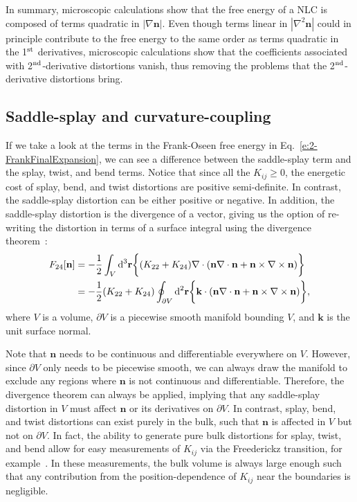 In summary, microscopic calculations show that the free energy of a NLC is composed of terms quadratic in $|\nabla \mathbf{n}|$.
Even though terms linear in $|\nabla ^2 \mathbf{n}|$ could in principle contribute to the free energy to the same order as terms quadratic in the 1$^\textup{\rm st}$ derivatives, microscopic calculations show that the coefficients associated with 2$^\textup{\rm nd}$-derivative distortions vanish, thus removing the problems that the 2$^\textup{\rm nd}$-derivative distortions bring.


\subsection{Saddle-splay and curvature-coupling}
If we take a look at the terms in the Frank-Oseen free energy in Eq.~\ref{e:2-FrankFinalExpansion}, we can see a difference between the saddle-splay term and the splay, twist, and bend terms.
Notice that since all the $K_{ij} \geq 0$, the energetic cost of splay, bend, and twist distortions are positive semi-definite.
In contrast, the saddle-splay distortion can be either positive or negative.
In addition, the saddle-splay distortion is the divergence of a vector, giving us the option of re-writing the distortion in terms of a surface integral using the divergence theorem~\cite{RN230}:
\begin{align}
  F_{24}[\mathbf{n}] &= - \frac{1}{2}\int_{V} \textup{d}^3  \mathbf{r} \bigg \{ (K_{22} + K_{24})  \nabla \cdot (\mathbf{n}\nabla \cdot \mathbf{n} + \mathbf{n} \times \nabla \times \mathbf{n}) \bigg \}\label{e:2-F24GaussA}  \\ &=
  - \frac{1}{2}(K_{22} + K_{24}) \oint_{\partial V} \textup{d}^2  \mathbf{r} \bigg \{   \mathbf{k} \cdot (\mathbf{n}\nabla \cdot \mathbf{n} + \mathbf{n} \times \nabla \times \mathbf{n}) \bigg \},\label{e:2-F24GaussB}
\end{align}
where $V$ is a volume, $\partial V$ is a piecewise smooth manifold bounding $V$, and $\mathbf{k}$ is the unit surface normal.

Note that $\mathbf{n}$ needs to be continuous and differentiable everywhere on $V$.
However, since $\partial V$ only needs to be piecewise smooth, we can always draw the manifold to exclude any regions where $\mathbf{n}$ is not continuous and differentiable.
Therefore, the divergence theorem can always be applied, implying that any saddle-splay distortion in $V$ must affect $\mathbf{n}$ or its derivatives on $\partial V$.
In contrast, splay, bend, and twist distortions can exist purely in the bulk, such that $\mathbf{n}$ is affected in $V$ but not on $\partial V$.
In fact, the ability to generate pure bulk distortions for splay, twist, and bend allow for easy measurements of $K_{ij}$ via the Freederickz transition, for example~\cite{RN212,RN213,RN33,RN188,RN182,RN183}.
In these measurements, the bulk volume is always large enough such that any contribution from the position-dependence of $K_{ij}$ near the boundaries is negligible.

